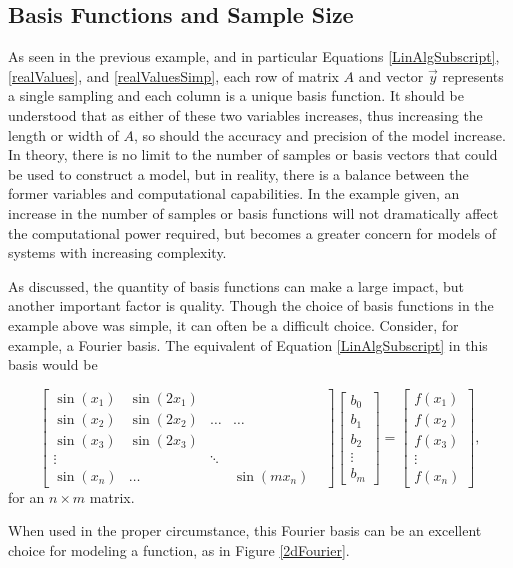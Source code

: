 \subsection{Basis Functions and Sample Size}\label{Sect:samplesAndFunctions}
\par As seen in the previous example, and in particular Equations \ref{LinAlgSubscript}, \ref{realValues}, and \ref{realValuesSimp}, each row of matrix $A$ and vector $\vec{y}$ represents a single sampling and each column is a unique basis function. It should be understood that as either of these two variables increases, thus increasing the length or width of $A$, so should the accuracy and precision of the model increase. In theory, there is no limit to the number of samples or basis vectors that could be used to construct a model, but in reality, there is a balance between the former variables and computational capabilities. In the example given, an increase in the number of samples or basis functions will not dramatically affect the computational power required, but becomes a greater concern for models of systems with increasing complexity. 
\par As discussed, the quantity of basis functions can make a large impact, but another important factor is quality. Though the choice of basis functions in the example above was simple, it can often be a difficult choice. Consider, for example, a Fourier basis. The equivalent of Equation \ref{LinAlgSubscript} in this basis would be

\begin{equation} \label{fourierBasis}
\begin{bmatrix}
\sin(x_1) & \sin(2x_1) \\
\sin(x_2) & \sin(2x_2) & \ldots & \ldots \\
\sin(x_3) & \sin(2x_3) \\
\vdots & & \ddots & & \\
\sin(x_n) & \ldots & & \sin(mx_n)
\end{bmatrix}
\begin{bmatrix}
b_0 \\
b_1 \\
b_2 \\
\vdots \\
b_m 
\end{bmatrix}
=
\begin{bmatrix}
f(x_1) \\ 
f(x_2) \\
f(x_3) \\ 
\vdots \\
f(x_n)
\end{bmatrix},
\end{equation}
for an $n\times m$ matrix.
\par When used in the proper circumstance, this Fourier basis can be an excellent choice for modeling a function, as in Figure \ref{2dFourier}.

